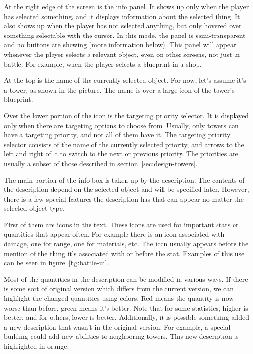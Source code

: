 At the right edge of the screen is the info panel.
It shows up only when the player has selected something, and it displays information about the selected thing.
It also shows up when the player has not selected anything, but only hovered over something selectable with the cursor.
In this mode, the panel is semi-transparent and no buttons are showing (more information below).
This panel will appear whenever the player selects a relevant object, even on other screens, not just in battle.
For example, when the player selects a blueprint in a shop.

At the top is the name of the currently selected object.
For now, let's assume it's a tower, as shown in the picture.
The name is over a large icon of the tower's blueprint.

Over the lower portion of the icon is the targeting priority selector.
It is displayed only when there are targeting options to choose from.
Usually, only towers can have a targeting priority, and not all of them have it.
The targeting priority selector consists of the name of the currently selected priority, and arrows to the left and right of it to switch to the next or previous priority.
The priorities are usually a subset of those described in section~\ref{sec:design-towers}.

The main portion of the info box is taken up by the description.
The contents of the description depend on the selected object and will be specified later.
However, there is a few special features the description has that can appear no matter the selected object type.

First of them are icons in the text.
These icons are used for important stats or quantities that appear often.
For example there is an icon associated with damage, one for range, one for materials, etc.
The icon usually appears before the mention of the thing it's associated with or before the stat.
Examples of this use can be seen in figure~\ref{fig:battle-ui}.

Most of the quantities in the description can be modified in various ways.
If there is some sort of original version which differs from the current version, we can highlight the changed quantities using colors.
Red means the quantity is now worse than before, green means it's better.
Note that for some statistics, higher is better, and for others, lower is better.
Additionally, it is possible something added a new description that wasn't in the original version.
For example, a special building could add new abilities to neighboring towers.
This new description is highlighted in orange.


